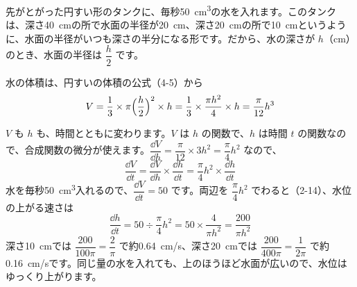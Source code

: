 
\leavevmode\label{bk:5-6:tank}\noindent\begin{minipage}[c]{0.64\linewidth}
先がとがった円すい形のタンクに、毎秒\qty{50}{cm^3}の水を入れます。このタンクは、深さ\qty{40}{cm}の所で水面の半径が\qty{20}{cm}、深さ\qty{20}{cm}の所で\qty{10}{cm}というように、水面の半径がいつも深さの半分になる形です。だから、水の深さが $h$（cm）のとき、水面の半径は $\dfrac{h}{2}$ です。

水の体積は、円すいの体積の公式（4-5）から
\[ V=\frac{1}{3}\times\pi\Bigl(\frac{h}{2}\Bigr)^2\times h=\frac{1}{3}\times\frac{\pi h^2}{4}\times h=\frac{\pi}{12}h^3 \]
\end{minipage}\hfill
\begin{minipage}[c]{0.32\linewidth}\centering
{}
\end{minipage}

\vspace{2pt}
$V$ も $h$ も、時間とともに変わります。$V$ は $h$ の関数で、$h$ は時間 $t$ の関数なので、合成関数の微分が使えます。$\dfrac{\dd V}{\dd h}=\dfrac{\pi}{12}\times3h^2=\dfrac{\pi}{4}h^2$ なので、
\[ \frac{\dd V}{\dd t}=\frac{\dd V}{\dd h}\times\frac{\dd h}{\dd t}=\frac{\pi}{4}h^2\times\frac{\dd h}{\dd t} \]
水を毎秒\qty{50}{cm^3}入れるので、$\dfrac{\dd V}{\dd t}=50$ です。両辺を $\dfrac{\pi}{4}h^2$ でわると（2-14）、水位の上がる速さは
\[ \frac{\dd h}{\dd t}=50\div\frac{\pi}{4}h^2=50\times\frac{4}{\pi h^2}=\frac{200}{\pi h^2} \]
深さ\qty{10}{cm}では $\dfrac{200}{100\pi}=\dfrac{2}{\pi}$ で約\qty{0.64}{cm/s}、深さ\qty{20}{cm}では $\dfrac{200}{400\pi}=\dfrac{1}{2\pi}$ で約\qty{0.16}{cm/s}です。同じ量の水を入れても、上のほうほど水面が広いので、水位はゆっくり上がります。


